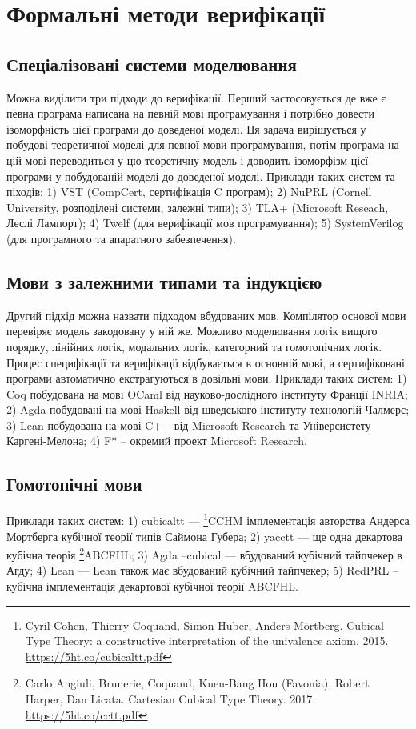 \section{Формальні методи верифікації}

\subsection{Спеціалізовані системи моделювання}
Можна виділити три підходи до верифікації.
Перший застосовується де вже є
певна програма написана на певній мові програмування і потрібно довести ізоморфність
цієї програми до доведеної моделі. Ця задача вирішується у побудові теоретичної моделі
для певної мови програмування, потім програма на цій мові переводиться у цю
теоретичну модель і доводить ізоморфізм цієї програми у побудованій моделі до доведеної моделі.
Приклади таких систем та піходів:
1) VST (CompCert, сертифікація C програм);
2) NuPRL (Cornell University, розподілені системи, залежні типи);
3) TLA+ (Microsoft Reseach, Леслі Лампорт);
4) Twelf (для верифікації мов програмування);
5) SystemVerilog (для програмного та апаратного забезпечення).

\subsection{Мови з залежними типами та індукцією}
Другий підхід можна назвати підходом вбудованих мов.
Компілятор основої мови перевіряє модель закодовану у ній же. Можливо моделювання
логік вищого порядку, лінійних логік, модальних логік, категорний та гомотопічних логік.
Процес специфікації та верифікації відбувається в основній мові, а сертифіковані програми
автоматично екстрагуються в довільні мови.
Приклади таких систем:
1) Coq побудована на мові OCaml від науково-дослідного інституту Франції INRIA;
2) Agda побудовані на мові Haskell від шведського інституту технологій Чалмерс;
3) Lean побудована на мові C++ від Microsoft Research та Універсистету Каргені-Мелона;
4) F* -- окремий проект Microsoft Research.

\newpage
\subsection{Гомотопічні мови}
Приклади таких систем:
1) cubicaltt --- \footnote{Cyril Cohen, Thierry Coquand, Simon Huber, Anders M{\"{o}}rtberg. Cubical Type Theory: a constructive interpretation of the univalence axiom. 2015. \url{https://5ht.co/cubicaltt.pdf}}{CCHM} імплементація авторства Андерса Мортберга кубічної теорії типів Саймона Губера;
2) yacctt --- ще одна декартова кубічна теорія \footnote{Carlo Angiuli, Brunerie, Coquand, Kuen-Bang Hou (Favonia), Robert Harper, Dan Licata. Cartesian Cubical Type Theory. 2017. \url{https://5ht.co/cctt.pdf}}{ABCFHL};
3) Agda --cubical --- вбудований кубічний тайпчекер в Агду;
4) Lean --- Lean також має вбудований кубічний тайпчекер;
5) RedPRL -- кубічна імплементація декартової кубічної теорії ABCFHL.


